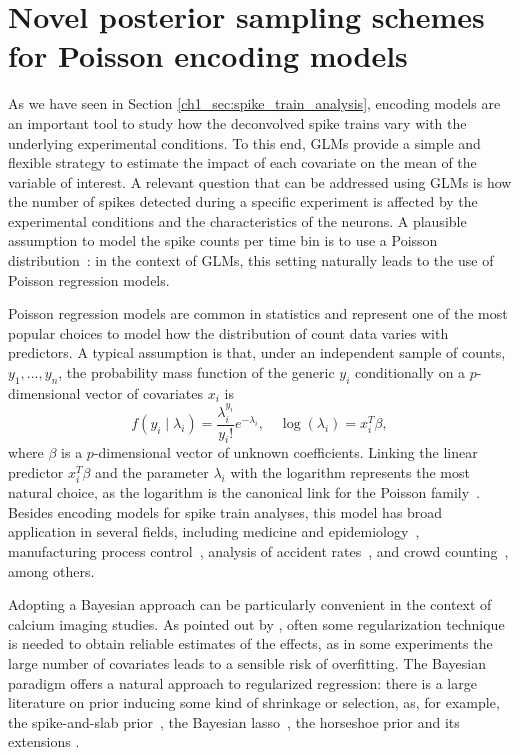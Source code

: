 \chapter{Novel posterior sampling schemes for Poisson encoding models}


As we have seen in Section \ref{ch1_sec:spike_train_analysis}, encoding models are an important tool to study how the deconvolved spike trains vary with the underlying experimental conditions. To this end, GLMs provide a simple and flexible strategy to estimate the impact of each covariate on the mean of the variable of interest.
A relevant question that can be addressed using GLMs is how the number of spikes detected during a specific experiment is affected by the experimental conditions and the characteristics of the neurons. A plausible assumption to model the spike counts per time bin is to use a Poisson distribution~\parencite{paninski2007}: in the context of GLMs, this setting naturally leads to the use of Poisson regression models. 

Poisson regression models are common in statistics and represent one of the most popular choices to model how the distribution of count data varies with predictors. A typical assumption is that, under an independent sample of counts, $y_1, \dots, y_n$, the probability mass function of the generic $y_i$ conditionally on a $p$-dimensional vector of covariates $x_i$ is
\begin{equation}
f(y_i \mid \lambda_i) =  \frac {\lambda_i^{y_i}}{{y_i}!}e^{-\lambda_i}, \quad \log(\lambda_i) = x_i^T \beta,
\label{ch2_eq:model0}
\end{equation}
where $\beta$ is a $p$-dimensional vector of unknown coefficients. Linking the linear predictor $x_i^T \beta$ and the parameter $\lambda_i$ with the logarithm represents the most natural choice, as the logarithm is the canonical link for the Poisson family~\parencite{nelder1972glm}.
Besides encoding models for spike train analyses, this model has broad application in several fields, including medicine and epidemiology~\parencite{Frome1983, frome1985, Hutchinson2005}, manufacturing process control~\parencite{lambert1992}, analysis of accident rates~\parencite{Sarath1990, Miaou1994}, and crowd counting~\parencite{chan2009}, among others.

Adopting a Bayesian approach can be particularly convenient in the context of calcium imaging studies. As pointed out by \textcite{paninski2007}, often some regularization technique is needed to obtain reliable estimates of the effects, as in some experiments the large number of covariates leads to a sensible risk of overfitting.
The Bayesian paradigm offers a natural approach to regularized regression: there is a large literature on prior inducing some kind of shrinkage or selection, as, for example, the spike-and-slab prior~\parencite{mitchell1988}, the Bayesian lasso~\parencite{park2008bayesian}, the horseshoe prior and its extensions \parencite{carvalho2010horseshoe, Piironen2017}.

